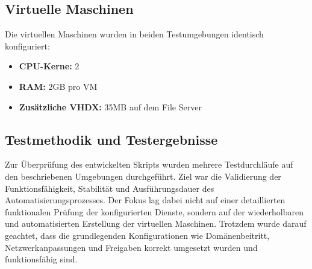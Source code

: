 \documentclass[a4paper,12pt]{article}
\begin{document}
\subsection*{Virtuelle Maschinen}

Die virtuellen Maschinen wurden in beiden Testumgebungen identisch konfiguriert:

\begin{itemize}
\item \textbf{CPU-Kerne:} 2
\item \textbf{RAM:} 2GB pro VM
\item \textbf{Zusätzliche VHDX:} 35MB auf dem File Server
\end{itemize}



\subsection*{Testmethodik und Testergebnisse}

Zur Überprüfung des entwickelten Skripts wurden mehrere Testdurchläufe auf den beschriebenen Umgebungen durchgeführt.
Ziel war die Validierung der Funktionsfähigkeit, Stabilität und Ausführungsdauer des Automatisierungsprozesses.
Der Fokus lag dabei nicht auf einer detaillierten funktionalen Prüfung der konfigurierten Dienste, sondern auf der wiederholbaren und automatisierten Erstellung der virtuellen Maschinen.
Trotzdem wurde darauf geachtet, dass die grundlegenden Konfigurationen wie Domänenbeitritt, Netzwerkanpassungen und Freigaben korrekt umgesetzt wurden und funktionsfähig sind.\\
\end{document}
